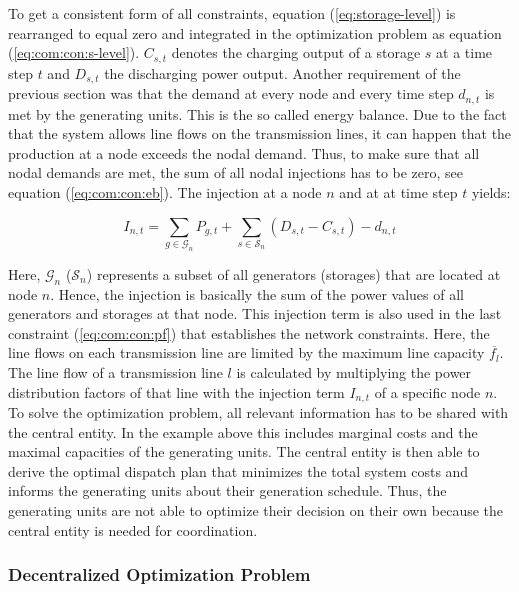 To get a consistent form of all constraints, equation (\ref{eq:storage-level}) is rearranged to equal zero and integrated in the optimization problem as equation (\ref{eq:com:con:s-level}). $C_{s,t}$ denotes the charging output of a storage $s$ at a time step $t$ and $D_{s,t}$ the discharging power output. Another requirement of the previous section was that the demand at every node and every time step $d_{n,t}$ is met by the generating units. This is the so called energy balance. Due to the fact that the system allows line flows on the transmission lines, it can happen that the production at a node exceeds the nodal demand. Thus, to make sure that all nodal demands are met, the sum of all nodal injections has to be zero, see equation (\ref{eq:com:con:eb}). The injection at a node $n$ and at at time step $t$ yields:

\begin{equation}
	I_{n,t} = \sum_{g\in\mathcal{G}_n}P_{g,t} + \sum_{s\in\mathcal{S}_n}(D_{s,t}-C_{s,t})-d_{n,t}
	\label{eq:injection-term}
\end{equation}

Here, $\mathcal{G}_n$ ($\mathcal{S}_n$) represents a subset of all generators (storages) that are located at node $n$. Hence, the injection is basically the sum of the power values of all generators and storages at that node. This injection term is also used in the last constraint (\ref{eq:com:con:pf}) that establishes the network constraints. Here, the line flows on each transmission line are limited by the maximum line capacity $\overline{f_l}$. The line flow of a transmission line $l$ is calculated by multiplying the power distribution factors of that line with the injection term $I_{n,t}$ of a specific node $n$.\\

	
To solve the optimization problem, all relevant information has to be shared with the central entity. In the example above this includes marginal costs and the maximal capacities of the generating units. The central entity is then able to derive the optimal dispatch plan that minimizes the total system costs and informs the generating units about their generation schedule. Thus, the generating units are not able to optimize their decision on their own because the central entity is needed for coordination.	

\subsubsection{Decentralized Optimization Problem}
\label{sec:app:dom}

